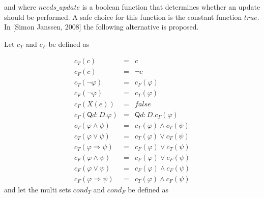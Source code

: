 \documentclass{article}
\begin{document}
and where $needs\_update$ is a boolean function that determines whether an
update should be performed. A safe choice for this function is the constant
function $true$. In [Simon Janssen, 2008] the following alternative is
proposed.

Let $c_{T}$ and $c_{F}$ be defined as

\begin{equation*}
\begin{array}{lll}
c_{T}(c) & = & c \\ 
c_{F}(c) & = & \lnot c \\ 
c_{T}(\lnot \varphi ) & = & c_{F}(\varphi ) \\ 
c_{F}(\lnot \varphi ) & = & c_{T}(\varphi ) \\ 
c_{\Gamma }(X(e)) & = & false \\ 
c_{\Gamma }(\mathsf{Q}d:{D}.\varphi ) & = & \mathsf{Q}d:{D}.c_{\Gamma
}(\varphi ) \\ 
c_{T}(\varphi \wedge \psi ) & = & c_{T}(\varphi )\wedge c_{T}(\psi ) \\ 
c_{T}(\varphi \vee \psi ) & = & c_{T}(\varphi )\vee c_{T}(\psi ) \\ 
c_{T}(\varphi \Rightarrow \psi ) & = & c_{F}(\varphi )\vee c_{T}(\psi ) \\ 
c_{F}(\varphi \wedge \psi ) & = & c_{F}(\varphi )\vee c_{F}(\psi ) \\ 
c_{F}(\varphi \vee \psi ) & = & c_{F}(\varphi )\wedge c_{F}(\psi ) \\ 
c_{F}(\varphi \Rightarrow \psi ) & = & c_{T}(\varphi )\wedge c_{F}(\psi )%
\end{array}%
\end{equation*}%
and let the multi sets $cond_{T}$ and $cond_{F}$ be defined as%
\end{document}
